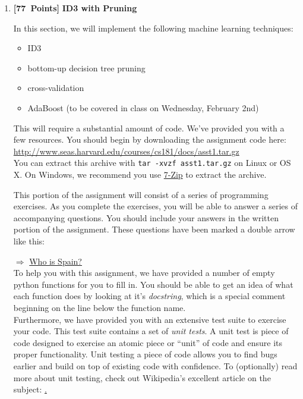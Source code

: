 \documentclass{article}
\newcommand{\points}[1]{\mbox{\textbf{[#1 Points]}}}
\begin{document}
\begin{enumerate}
\item \points{77} \textbf{ID3 with Pruning}

In this section, we will implement the following machine learning techniques:
\begin{itemize}
\item ID3
\item bottom-up decision tree pruning
\item cross-validation
\item AdaBoost (to be covered in class on Wednesday, February 2nd)
\end{itemize}

This will require a substantial amount of code. We've provided you
with a few resources. You should begin by downloading the assignment
code here:
\url{http://www.seas.harvard.edu/courses/cs181/docs/asst1.tar.gz}\\
You can extract this archive with \verb=tar -xvzf asst1.tar.gz= on
Linux or OS X. On Windows, we recommend you use
\href{http://www.7-zip.org/}{7-Zip} to extract the archive.

This portion of the assignment will consist of a series of programming
exercises. As you complete the exercises, you will be able to answer a
series of accompanying questions. You should include your answers in
the written portion of the assignment. These questions have been
marked a double arrow like this:

$\Rightarrow$ \href{http://books.google.com/books?id=\_0YB05NPhJUC\&pg=PA34\&lpg=PA34\&dq=catch+22+who+is+spain+why+is+hitler\&source=bl\&ots=647YrqxwpY\&sig=PT4udMwGjMMJS2AtqpNDP-sopw0\&hl=en\&ei=q\_FFTeOqKMOqlAef4fgf\&sa=X\&oi=book\_result\&ct=result\&resnum=2\&ved=0CCMQ6AEwAQ\#v=onepage\&q\&f=false}{Who is Spain?}\\

To help you with this assignment, we
have provided a number of empty python functions for you to fill
in. You should be able to get an idea of what each function does by
looking at it's {\em docstring}, which is a special comment beginning
on the line below the function name.\\

Furthermore, we have provided you with an extensive test suite to
exercise your code. This test suite contains a set of {\em unit
  tests}. A unit test is piece of code designed to exercise an atomic
piece or ``unit'' of code and ensure its proper functionality. Unit
testing a piece of code allows you to find bugs earlier and build on
top of existing code with confidence. To (optionally) read more about
unit testing, check out Wikipedia's excellent article on the subject:
\href{http://en.wikipedia.org/wiki/Unit_testing}.


\end{enumerate}
\end{document}
